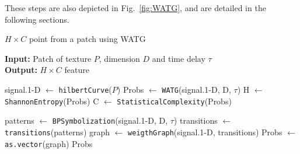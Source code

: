 \documentclass[journal]{IEEEtran}
\begin{document}
These steps are also depicted in Fig.~\ref{fig:WATG}, and are detailed in the following sections.

\begin{algorithm}[hbt]
	\caption{$H \times C$ point from a patch using WATG}
	\label{alg:watg}                                
	\textbf{Input:} Patch of texture $P$, dimension $D$ and time delay \textbf{$\tau$}\\
	\textbf{Output:} $H \times C$ feature
	\begin{algorithmic}[1]
		\State signal.\mbox{1-D} $\gets$ \texttt{hilbertCurve}($P$) \label{Line:Peano}
		\State Probs $\gets$ \texttt{WATG}(signal.\mbox{1-D}, D, $\tau$) \label{Line:Probs}
		\State H $\gets$ \texttt{ShannonEntropy}(Probs) \label{Line:Shannon}
		\State C $\gets$ \texttt{StatisticalComplexity}(Probs) \label{Line:StatisticalComplexity}
		
		\vspace{0.15cm}
		
		\State patterns $\gets$ \label{Line:WATGBegin} \texttt{BPSymbolization}(signal.\mbox{1-D}, D, $\tau$) \label{Line:BP}
		\State transitions $\gets$ \texttt{transitions}(patterns) \label{Line:Transitions}
		\State graph $\gets$ \texttt{weigthGraph}(signal.\mbox{1-D}, transitions) \label{Line:WG}
		\State Probs $\gets$ \texttt{as.vector}(graph) \label{Line:WATGEnd}
		\State \Return Probs
		\EndFunction
	\end{algorithmic}
\end{algorithm}
\end{document}
